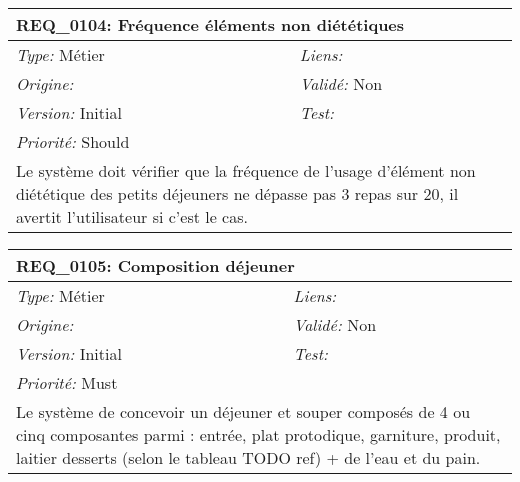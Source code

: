 \begin{table}[!h]

\begin{tabular}{|p{60mm}p{100mm}|}

\hline

\multicolumn{2}{|l|}{\textbf{REQ\_0104:} Fréquence éléments non diététiques} \\ \hline

\emph{Type:} Métier & \emph{Liens:}  \\

\emph{Origine:}  & \emph{Validé:} Non \\

\emph{Version:} Initial & \emph{Test:}  \\

\emph{Priorité:} Should & \\ \hline

\multicolumn{2}{|p{16cm}|}{Le système doit vérifier que la fréquence de l'usage d'élément non diététique des petits déjeuners ne dépasse pas 3 repas sur 20, il avertit l'utilisateur si c'est le cas.} \\ \hline

\end{tabular}

\end{table}



\begin{table}[!h]

\begin{tabular}{|p{60mm}p{100mm}|}

\hline

\multicolumn{2}{|l|}{\textbf{REQ\_0105:} Composition déjeuner} \\ \hline

\emph{Type:} Métier & \emph{Liens:}  \\

\emph{Origine:}  & \emph{Validé:} Non \\

\emph{Version:} Initial & \emph{Test:}  \\

\emph{Priorité:} Must & \\ \hline

\multicolumn{2}{|p{16cm}|}{Le système de concevoir un déjeuner et souper composés de 4 ou cinq composantes parmi : entrée, plat protodique, garniture, produit, laitier desserts (selon le tableau TODO ref) + de l'eau et du pain.} \\ \hline

\end{tabular}

\end{table}



